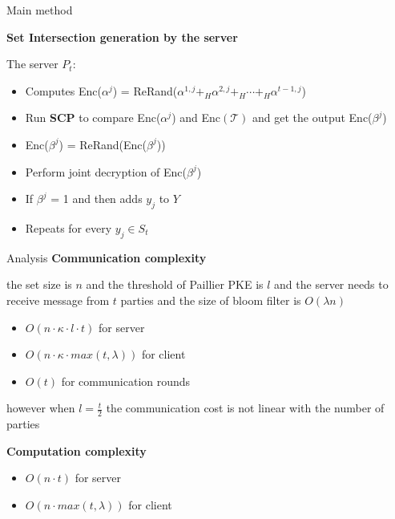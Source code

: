 \begin{frame}{Main method}

    \textbf{Set Intersection generation by the server}

    \vspace{0.5cm}
    The server $P_t$:
    \begin{itemize}
        \item Computes Enc($\alpha^j$) = ReRand($\alpha^{1,j}+_H\alpha^{2,j}+_H\cdots +_H \alpha^{t-1,j}$)
        \item Run \textbf{SCP} to compare Enc($\alpha^j$) and Enc$(\mathcal{T} )$ and get the output Enc($\beta^{j}$)
        \item Enc($\beta^{j}$) = ReRand(Enc($\beta^{j}$)) 
        \item Perform joint decryption of Enc($\beta^{j}$)
        \item If $\beta^{j}$ = 1 and then adds $y_j$ to $Y$
        \item Repeats for every $y_j \in S_t$
    \end{itemize}
\end{frame}


\begin{frame}{Analysis}
    \textbf{Communication complexity}

    \vspace{0.25cm}

    the set size is $n$ and the threshold of Paillier PKE is $l$ and the server needs to receive message from $t$ parties and 
    the size of bloom filter is $O(\lambda n)$

    \vspace{0.25cm}


    \begin{itemize}
        \item $O(n \cdot \kappa \cdot l \cdot t )$ for server
        \item $O(n \cdot \kappa \cdot max(t,\lambda))$ for client
        \item $O(t)$ for communication rounds
    \end{itemize}

    \vspace{0.25cm}

    however when $l = \frac{t}{2}$ the communication cost is not linear with the number of parties

    \vspace{0.25cm}

    \textbf{Computation complexity}

    \begin{itemize}
        \item $O(n\cdot t)$ for server
        \item $O(n \cdot max(t,\lambda))$ for client
    \end{itemize}


\end{frame}


